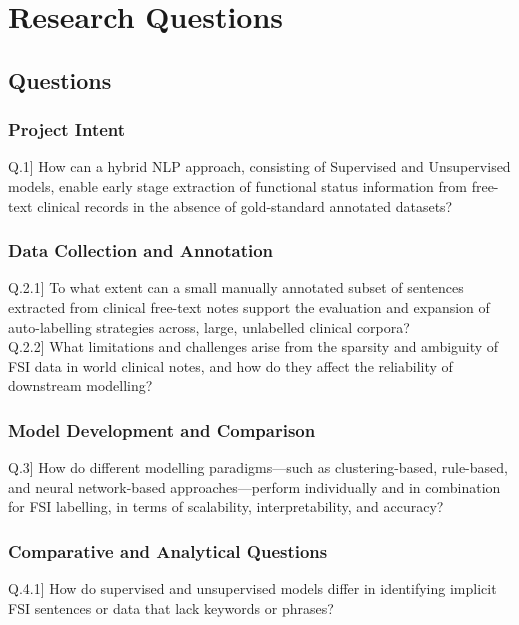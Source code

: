 \chapter{Research Questions}

\section {Questions}
\subsection{Project Intent}
Q.1] How can a hybrid NLP approach, consisting of Supervised and Unsupervised models, enable early stage extraction of functional status information from free-text clinical records in the absence of gold-standard annotated datasets?

\subsection{Data Collection and Annotation}
Q.2.1] To what extent can a small manually annotated subset of sentences extracted from clinical free-text notes support the evaluation and expansion of auto-labelling strategies across, large, unlabelled clinical corpora?\\
Q.2.2] What limitations and challenges arise from the sparsity and ambiguity of FSI data in world clinical notes, and how do they affect the reliability of downstream modelling?

\subsection{Model Development and Comparison}
Q.3]  How do different modelling paradigms—such as clustering-based, rule-based, and neural network-based approaches—perform individually and in combination for FSI labelling, in terms of scalability, interpretability, and accuracy?

\subsection{Comparative and Analytical Questions}
Q.4.1] How do supervised and unsupervised models differ in identifying implicit FSI sentences or data that lack keywords or phrases? 

